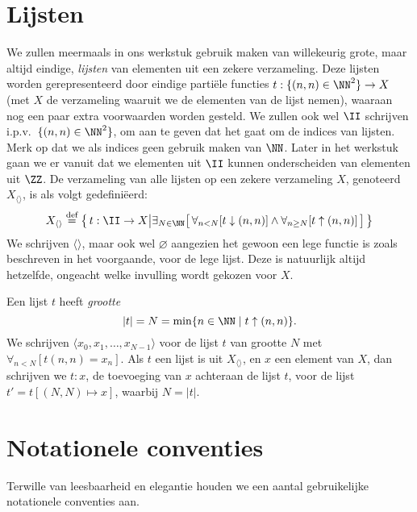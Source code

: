 \section{Lijsten}
\label{sec:lijsten}

We zullen meermaals in ons werkstuk gebruik maken van willekeurig grote, maar altijd eindige, \emph{lijsten} van elementen uit een zekere verzameling. Deze lijsten worden gerepresenteerd door eindige partiële functies $t : \{(n, n) \in \NN^2\} \to X$ (met $X$ de verzameling waaruit we de elementen van de lijst nemen), waaraan nog een paar extra voorwaarden worden gesteld. We zullen ook wel $\II$ schrijven i.p.v.~$\{(n, n) \in \NN^2\}$, om aan te geven dat het gaat om de indices van lijsten. Merk op dat we als indices geen gebruik maken van $\NN$. Later in het werkstuk gaan we er vanuit dat we elementen uit $\II$ kunnen onderscheiden van elementen uit $\ZZ$. De verzameling van alle lijsten op een zekere verzameling $X$, genoteerd $X_{\langle\rangle}$, is als volgt gedefiniëerd:
\begin{equation*}
X_{\langle\rangle} \DEF \big\{\, t : \II \to X \big\vert \exists_{N \in \NN} \surr{ \forall_{n < N}[t \downarrow (n, n)] \land \forall_{n\ge N}[t \uparrow (n, n)] } \,\big\}
\end{equation*}
We schrijven $\langle\rangle$, maar ook wel $\varnothing$ aangezien het gewoon een lege functie is zoals beschreven in het voorgaande, voor de lege lijst. Deze is natuurlijk altijd hetzelfde, ongeacht welke invulling wordt gekozen voor $X$.

Een lijst $t$ heeft \emph{grootte}
%
\begin{equation*}
  |t| = N = \min\{n\in\NN \mid t \uparrow (n, n)\}.
\end{equation*}
%
We schrijven $\langle x_0, x_1, \dots, x_{N-1}\rangle$ voor de lijst $t$ van grootte $N$ met $\forall_{n < N}[t(n, n) = x_n]$.
Als $t$ een lijst is uit $X_{\langle\rangle}$, en $x$ een element van $X$, dan schrijven we $t:x$, de toevoeging van $x$ achteraan de lijst $t$, voor de lijst $t' = t[(N, N) \mapsto x]$, waarbij $N = |t|$.

\section{Notationele conventies}
\label{sec:conventies}

Terwille van leesbaarheid en elegantie houden we een aantal gebruikelijke notationele conventies aan.

